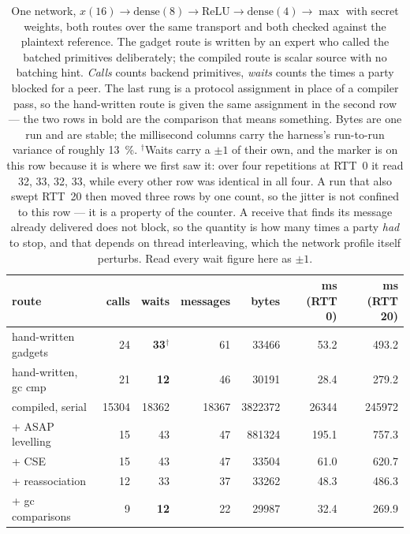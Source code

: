 \documentclass[11pt]{article}
\newcommand{\ReLU}{\ensuremath{\mathrm{ReLU}}}
\begin{document}
\begin{table}[htb]
\centering
\small
\begin{tabular}{@{}lrrrrrr@{}}
\toprule
route & calls & \textbf{waits} & messages & bytes & ms (RTT 0) & ms (RTT 20) \\
\midrule
hand-written gadgets & \num{24} & \textbf{\num{33}}$^\dagger$ & \num{61} & \num{33466} & 53.2 & 493.2 \\
hand-written, gc cmp & \num{21} & \textbf{\num{12}} & \num{46} & \num{30191} & 28.4 & 279.2 \\
\midrule
compiled, serial & \num{15304} & \num{18362} & \num{18367} & \num{3822372} & \num{26344} & \num{245972} \\
\quad + ASAP levelling & \num{15} & \num{43} & \num{47} & \num{881324} & 195.1 & 757.3 \\
\quad + CSE & \num{15} & \num{43} & \num{47} & \num{33504} & 61.0 & 620.7 \\
\quad + reassociation & \num{12} & \num{33} & \num{37} & \num{33262} & 48.3 & 486.3 \\
\quad + gc comparisons & \num{9} & \textbf{\num{12}} & \num{22} & \num{29987} & 32.4 & 269.9 \\
\bottomrule
\end{tabular}
\caption{One network, $x(16) \to \text{dense}(8) \to \ReLU \to \text{dense}(4) \to \max$ with
secret weights, both routes over the same transport and both checked against the plaintext
reference. The gadget route is written by an expert who called the batched primitives
deliberately; the compiled route is scalar source with no batching hint. \emph{Calls} counts
backend primitives, \emph{waits} counts the times a party blocked for a peer. The last rung is a
protocol assignment in place of a compiler pass, so the hand-written route is given the same
assignment in the second row --- the two rows in bold are the comparison that means something.
Bytes are one run and are stable; the millisecond columns carry the harness's run-to-run variance
of roughly \SI{13}{\percent}. $^\dagger$Waits carry a $\pm 1$ of their own, and the marker is on
this row because it is where we first saw it: over four repetitions at RTT~0 it read \num{32},
\num{33}, \num{32}, \num{33}, while every other row was identical in all four. A run that also
swept RTT~20 then moved three rows by one count, so the jitter is not confined to this row --- it
is a property of the counter. A receive that finds its message already delivered does not block, so
the quantity is how many times a party \emph{had} to stop, and that depends on thread interleaving,
which the network profile itself perturbs. Read every wait figure here as $\pm 1$.}
\label{tab:handvscompiled}
\end{table}
\end{document}
